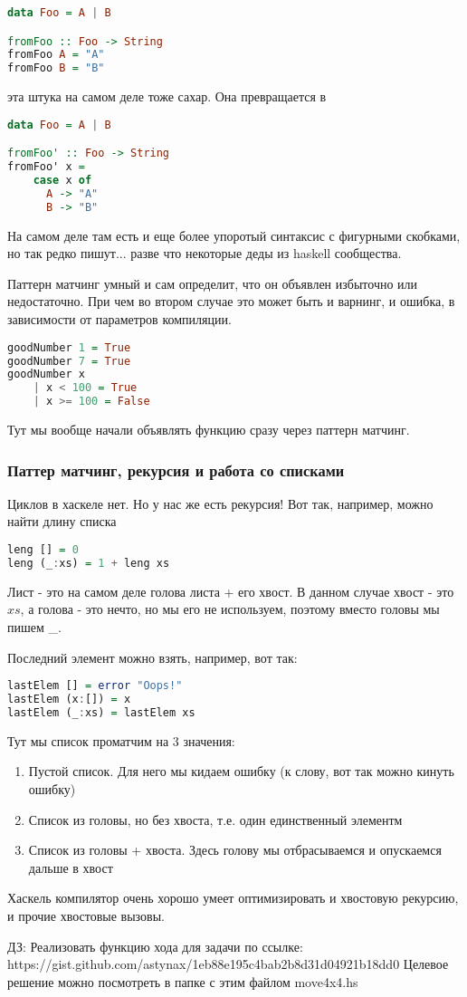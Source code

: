 \documentclass[10pt, a4paper]{article}
\begin{document}
\begin{lstlisting}[language=haskell]
data Foo = A | B

fromFoo :: Foo -> String 
fromFoo A = "A"
fromFoo B = "B"
\end{lstlisting}

эта штука на самом деле тоже сахар. Она превращается в 

\begin{lstlisting}[language=haskell]
data Foo = A | B

fromFoo' :: Foo -> String 
fromFoo' x = 
    case x of
      A -> "A"
      B -> "B"
\end{lstlisting}

На самом деле там есть и еще более упоротый синтаксис с фигурными скобками, но так редко пишут... разве что некоторые деды из haskell сообщества.

Паттерн матчинг умный и сам определит, что он объявлен избыточно или недостаточно. При чем во втором случае это может быть и варнинг, и ошибка, в зависимости от параметров компиляции.

\begin{lstlisting}[language=haskell]
goodNumber 1 = True
goodNumber 7 = True
goodNumber x 
    | x < 100 = True
    | x >= 100 = False 
\end{lstlisting}

Тут мы вообще начали объявлять функцию сразу через паттерн матчинг.

\subsubsection{Паттер матчинг, рекурсия и работа со списками}
Циклов в хаскеле нет. Но у нас же есть рекурсия! Вот так, например, можно найти длину списка
\begin{lstlisting}[language=haskell]
leng [] = 0
leng (_:xs) = 1 + leng xs 
\end{lstlisting}

Лист - это на самом деле голова листа + его хвост. В данном случае хвост - это $xs$, а голова - это нечто, но мы его не используем, поэтому вместо головы мы пишем \_.

Последний элемент можно взять, например, вот так:
\begin{lstlisting}[language=haskell]
lastElem [] = error "Oops!"
lastElem (x:[]) = x
lastElem (_:xs) = lastElem xs
\end{lstlisting}

Тут мы список проматчим на 3 значения:
\begin{enumerate}
	\item Пустой список. Для него мы кидаем ошибку (к слову, вот так можно кинуть ошибку)
	\item Список из головы, но без хвоста, т.е. один единственный элементм
	\item Список из головы + хвоста. Здесь голову мы отбрасываемся и опускаемся дальше в хвост
\end{enumerate}

Хаскель компилятор очень хорошо умеет оптимизировать и хвостовую рекурсию, и прочие хвостовые вызовы.

ДЗ: Реализовать функцию хода для задачи по ссылке: https://gist.github.com/astynax/1eb88e195c4bab2b8d31d04921b18dd0
Целевое решение можно посмотреть в папке с этим файлом {\br move4x4.hs}
\end{document}
